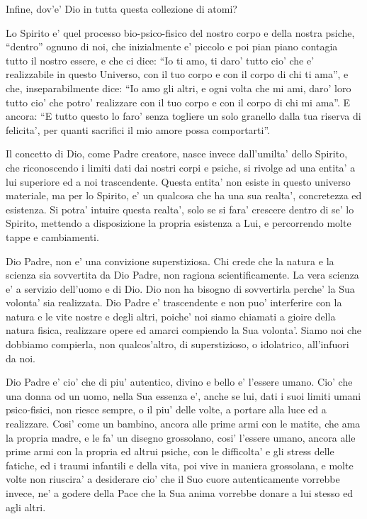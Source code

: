 Infine, dov'e' Dio in tutta questa collezione di atomi? 

Lo Spirito e' quel processo bio-psico-fisico del nostro corpo e della nostra psiche, ``dentro'' ognuno di noi, che inizialmente e' piccolo e poi pian piano contagia tutto il nostro essere, e che ci dice: ``Io ti amo, ti daro' tutto cio' che e' realizzabile in questo Universo, con il tuo corpo e con il corpo di chi ti ama'', e che, inseparabilmente dice: ``Io amo gli altri, e ogni volta che mi ami, daro' loro tutto cio' che potro' realizzare con il tuo corpo e con il corpo di chi mi ama''. E ancora: ``E tutto questo lo faro' senza togliere un solo granello dalla tua riserva di felicita', per quanti sacrifici il mio amore possa comportarti''.

Il concetto di Dio, come Padre creatore, nasce invece dall'umilta' dello Spirito, che riconoscendo i limiti dati dai nostri corpi e psiche, si rivolge ad una entita' a lui superiore ed a noi trascendente. Questa entita' non esiste in questo universo materiale, ma per lo Spirito, e' un qualcosa che ha una sua realta', concretezza ed esistenza. Si potra' intuire questa realta', solo se si fara' crescere dentro di se' lo Spirito, mettendo a disposizione la propria esistenza a Lui, e percorrendo molte tappe e cambiamenti.

Dio Padre, non e' una convizione superstiziosa. Chi crede che la natura e la scienza sia sovvertita da Dio Padre, non ragiona scientificamente. La vera scienza e' a servizio dell'uomo e di Dio. Dio non ha bisogno di sovvertirla perche' la Sua volonta' sia realizzata. Dio Padre e' trascendente e non puo' interferire con la natura e le vite nostre e degli altri, poiche' noi siamo chiamati a gioire della natura fisica, realizzare opere ed amarci compiendo la Sua volonta'. Siamo noi che dobbiamo compierla, non qualcos'altro, di superstizioso, o idolatrico, all'infuori da noi. 

Dio Padre e' cio' che di piu' autentico, divino e bello e' l'essere umano. Cio' che una donna od un uomo, nella Sua essenza e', anche se lui, dati i suoi limiti umani psico-fisici, non riesce sempre, o il piu' delle volte, a portare alla luce ed a realizzare. Cosi' come un bambino, ancora alle prime armi con le matite, che ama la propria madre, e le fa' un disegno grossolano, cosi' l'essere umano, ancora alle prime armi con la propria ed altrui psiche, con le difficolta' e gli stress delle fatiche, ed i traumi infantili e della vita, poi vive in maniera grossolana, e molte volte non riuscira' a desiderare cio' che il Suo cuore autenticamente vorrebbe invece, ne' a godere della Pace che la Sua anima vorrebbe donare a lui stesso ed agli altri.

